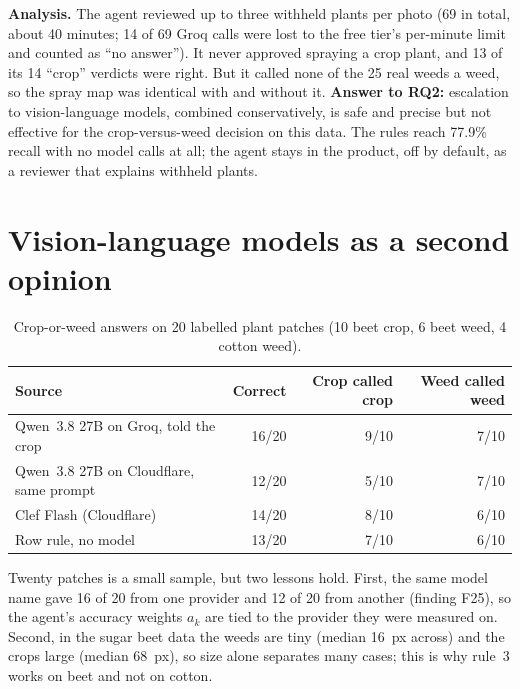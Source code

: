 \textbf{Analysis.} The agent reviewed up to three withheld plants per photo (69 in total, about 40
minutes; 14 of 69 Groq calls were lost to the free tier's per-minute limit and counted as ``no
answer''). It never approved spraying a crop plant, and 13 of its 14 ``crop'' verdicts were right. But
it called none of the 25 real weeds a weed, so the spray map was identical with and without it.
\textbf{Answer to RQ2:} escalation to vision-language models, combined conservatively, is safe and
precise but not effective for the crop-versus-weed decision on this data. The rules reach 77.9\%
recall with no model calls at all; the agent stays in the product, off by default, as a reviewer that
explains withheld plants.

\section{Vision-language models as a second opinion}
\begin{table}[H]
\centering
\caption{Crop-or-weed answers on 20 labelled plant patches (10 beet crop, 6 beet weed, 4 cotton weed).}\label{tab:vlm}
\begin{small}
\begin{tabularx}{\textwidth}{@{}YRRR@{}}
\toprule
\textbf{Source} & \textbf{Correct} & \textbf{Crop called crop} & \textbf{Weed called weed}\\
\midrule
Qwen~3.8 27B on Groq, told the crop & 16/20 & 9/10 & 7/10\\
Qwen~3.8 27B on Cloudflare, same prompt & 12/20 & 5/10 & 7/10\\
Clef Flash (Cloudflare) & 14/20 & 8/10 & 6/10\\
Row rule, no model & 13/20 & 7/10 & 6/10\\
\bottomrule
\end{tabularx}
\end{small}
\end{table}
Twenty patches is a small sample, but two lessons hold. First, the same model name gave 16 of 20 from
one provider and 12 of 20 from another (finding F25), so the agent's accuracy weights $a_k$ are tied to
the provider they were measured on. Second, in the sugar beet data the weeds are tiny (median 16~px
across) and the crops large (median 68~px), so size alone separates many cases; this is why rule~3
works on beet and not on cotton.

